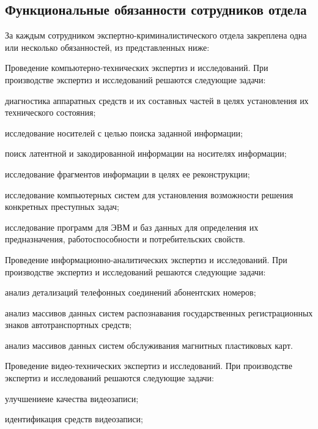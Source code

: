 \subsection{Функциональные обязанности сотрудников отдела}

За каждым сотрудником экспертно-криминалистического отдела закреплена одна или несколько обязанностей, из представленных ниже:

\begin{enumerate*}
\item Проведение компьютерно-технических экспертиз и исследований. При производстве экспертиз и исследований решаются следующие задачи:
	\begin{itemize*}
		\item диагностика аппаратных средств и их составных частей в целях установления их технического состояния;
		\item исследование носителей с целью поиска заданной информации;
		\item поиск латентной и закодированной информации на носителях информации;
		\item исследование фрагментов информации в целях ее реконструкции;
		\item исследование компьютерных систем для установления возможности решения конкретных преступных задач;
		\item исследование программ для ЭВМ и баз данных для определения их предназначения, работоспособности и потребительских свойств.
	\end{itemize*}
	\item Проведение информационно-аналитических экспертиз и исследований. При производстве экспертиз и исследований решаются следующие задачи:
	\begin{itemize*}
		\item анализ детализаций телефонных соединений абонентских номеров;
		\item анализ массивов данных систем распознавания государственных регистрационных знаков автотранспортных средств;
		\item анализ массивов данных систем обслуживания магнитных пластиковых карт.
	\end{itemize*}
	\item Проведение	видео-технических	экспертиз	и	исследований.	При
производстве экспертиз и исследований решаются следующие задачи:
	\begin{itemize*}
		\item улучшениеие качества видеозаписи;
		\item идентификация средств видеозаписи;

\end{itemize*}
\end{enumerate*}
